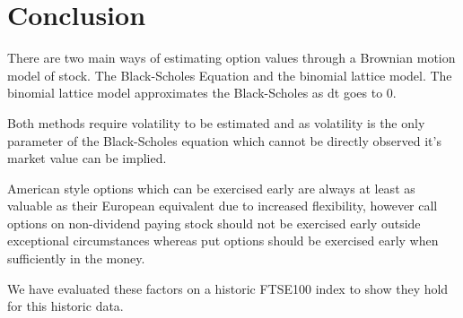 \documentclass{sig-alternate-05-2015}
\begin{document}
\section{Conclusion}
There are two main ways of estimating option values through a Brownian motion model of stock. The Black-Scholes Equation and the binomial lattice model. The binomial lattice model approximates the Black-Scholes as dt goes to 0. 

Both methods require volatility to be estimated and as volatility is the only parameter of the Black-Scholes equation which cannot be directly observed it's market value can be implied. 

American style options which can be exercised early are always at least as valuable as their European equivalent due to increased flexibility, however call options on non-dividend paying stock should not be exercised early outside exceptional circumstances whereas put options should be exercised early when sufficiently in the money. 

We have evaluated these factors on a historic FTSE100 index to show they hold for this historic data. 


\end{document}
